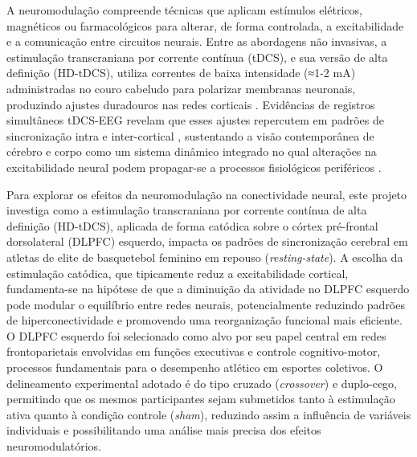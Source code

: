 A neuromodulação compreende técnicas que aplicam estímulos elétricos, magnéticos ou farmacológicos para alterar, de forma controlada, a excitabilidade e a comunicação entre circuitos neurais. Entre as abordagens não invasivas, a estimulação transcraniana por corrente contínua (tDCS), e sua versão de alta definição (HD-tDCS), utiliza correntes de baixa intensidade (≈1-2 mA) administradas no couro cabeludo para polarizar membranas neuronais, produzindo ajustes duradouros nas redes corticais \cite{nitsche2000excitability,stagg2011physiological}. Evidências de registros simultâneos tDCS-EEG revelam que esses ajustes repercutem em padrões de sincronização intra e inter-cortical \cite{kunze2014high}, sustentando a visão contemporânea de cérebro e corpo como um sistema dinâmico integrado no qual alterações na excitabilidade neural podem propagar-se a processos fisiológicos periféricos \cite{criscuolo2022cognition}.

Para explorar os efeitos da neuromodulação na conectividade neural, este projeto investiga como a estimulação transcraniana por corrente contínua de alta definição (HD-tDCS), aplicada de forma catódica sobre o córtex pré-frontal dorsolateral (DLPFC) esquerdo, impacta os padrões de sincronização cerebral em atletas de elite de basquetebol feminino em repouso (\textit{resting-state}). A escolha da estimulação catódica, que tipicamente reduz a excitabilidade cortical, fundamenta-se na hipótese de que a diminuição da atividade no DLPFC esquerdo pode modular o equilíbrio entre redes neurais, potencialmente reduzindo padrões de hiperconectividade e promovendo uma reorganização funcional mais eficiente. O DLPFC esquerdo foi selecionado como alvo por seu papel central em redes frontoparietais envolvidas em funções executivas e controle cognitivo-motor, processos fundamentais para o desempenho atlético em esportes coletivos. O delineamento experimental adotado é do tipo cruzado (\textit{crossover}) e duplo-cego, permitindo que os mesmos participantes sejam submetidos tanto à estimulação ativa quanto à condição controle (\textit{sham}), reduzindo assim a influência de variáveis individuais e possibilitando uma análise mais precisa dos efeitos neuromodulatórios.

